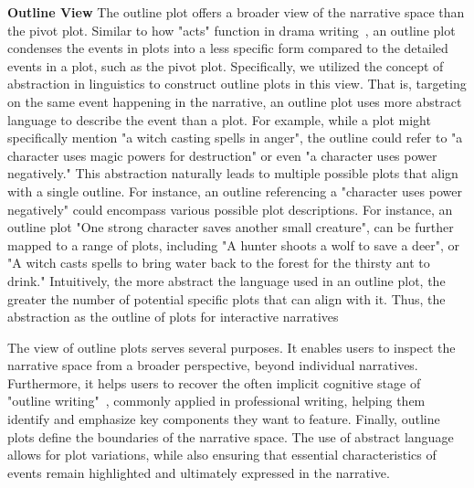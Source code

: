 



\noindent\textbf{Outline View}
The outline plot offers a broader view of the narrative space than the pivot plot. Similar to how "acts" function in drama writing~\cite{styan1960elements}, an outline plot condenses the events in plots into a less specific form compared to the detailed events in a plot, such as the pivot plot.  Specifically, we utilized the concept of abstraction in linguistics to construct outline plots in this view. That is, targeting on the same event happening in the narrative, an outline plot uses more abstract language to describe the event than a plot. For example, while a plot might specifically mention "a witch casting spells in anger", the outline could refer to "a character uses magic powers for destruction" or even "a  character uses power negatively." This abstraction naturally leads to multiple possible plots that align with a single outline. For instance, an outline referencing a "character uses power negatively" could encompass various possible plot descriptions. For instance, an outline plot "One strong character saves another small creature", can be further mapped to a range of plots, including "A hunter shoots a wolf to save a deer", or "A witch casts spells to bring water back to the forest for the thirsty ant to drink."
Intuitively, the more abstract the language used in an outline plot, the greater the number of potential specific plots that can align with it. Thus, the abstraction  as the outline of plots for interactive narratives


The view of outline plots serves several purposes. It enables users to inspect the narrative space from a broader perspective, beyond individual narratives. Furthermore, it helps users to recover the often implicit cognitive stage of "outline writing"~\cite{hayes1983cognitive}, commonly applied in professional writing, helping them identify and emphasize key components they want to feature. Finally, outline plots define the boundaries of the narrative space. The use of abstract language allows for plot variations, while also ensuring that essential characteristics of events remain highlighted and ultimately expressed in the narrative. 


